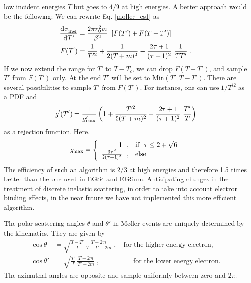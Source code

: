 low incident energies $T$ but goes to $4/9$ at high energies.
A better approach would be the following: We can rewrite
Eq. \eqref{moller_cs1} as
\begin{equation}
\begin{split}
{{\rm d} \sigma_{\rm inel}^- \over  {\rm d}T'} & =
{2 \pi r_0^2 m \over \beta^2}~ \left[ F(T') + F(T-T') \right] \\
F(T') &= \frac{1}{T^{\prime 2}} + {1 \over 2 (T+m)^2} -
{2 \tau + 1 \over (\tau+1)^2}~\frac{1}{T T'} ~.
\end{split}
\end{equation}
If we now extend the range for $T'$ to $T-T_c$, we can drop
$F(T-T')$, and sample $T'$ from $F(T')$ only. At the end
$T'$ will be set to Min$(T',T-T')$. There are several possibilities
to sample $T'$ from $F(T')$. For instance, one can use
$1/T^{\prime 2}$ as a PDF and
\begin{equation}
g'(T') = \frac{1}{g'_{\rm max}} \left(1 + {T^{\prime 2} \over 2 (T+m)^2}
- {2 \tau + 1 \over (\tau + 1)^2}~ \frac{T'}{T} \right)
\end{equation}
as a rejection function. Here,
\begin{equation}
g_{\rm max} = \left\{
\begin{array}{r@{~~, \quad}l}
1 & \text{if}~~ \tau \le 2 + \sqrt{6} \\
{3 \tau^2 \over 2 (\tau+1)^2 } & \text{else}
\end{array} \right.
\end{equation}
The efficiency of such an algorithm is $2/3$ at high energies and
therefore 1.5 times better than the one used in EGS4 and EGSnrc.
Anticipating changes in the treatment of discrete inelastic
scattering, in order to take into account electron binding
effects, in the near future we have not implemented
this more efficient algorithm.

The polar scattering angles $\theta$ and $\theta'$
in M{\o}ller events are uniquely
determined by the kinematics. They are given by
\begin{equation}
\label{moller_angles}
\begin{split}
\cos \theta & = \sqrt{\frac{T-T'}{T}~\frac{T+2 m}{T-T' + 2 m}}~, \quad
\text{for the higher energy electron,} \\
\cos \theta' & = \sqrt{\frac{T'}{T}~\frac{T+2 m}{T' + 2 m}}~, \quad
\quad \quad \quad \quad  \text{for the lower energy electron.}
\end{split}
\end{equation}
The azimuthal angles are opposite and sample uniformly between
zero and $2 \pi$.

